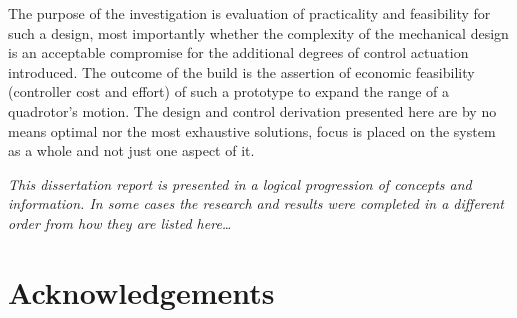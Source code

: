 \documentclass[a4paper, 11pt, oneside, openright, parskip=full]{book}
\begin{document}
\par
The purpose of the investigation is evaluation of practicality and feasibility for such a design, most importantly whether the complexity of the mechanical design is an acceptable compromise for the additional degrees of control actuation introduced. The outcome of the build is the assertion of economic feasibility (controller cost and effort) of such a prototype to expand the range of a quadrotor's motion. The design and control derivation presented here are by no means optimal nor the most exhaustive solutions, focus is placed on the system as a whole and not just one aspect of it.
\par
\emph{This dissertation report is presented in a logical progression of concepts and information. In some cases the research and results were completed in a different order from how they are listed here\ldots}
\chapter{Acknowledgements}		
\label{ch:ack}



\end{document}
